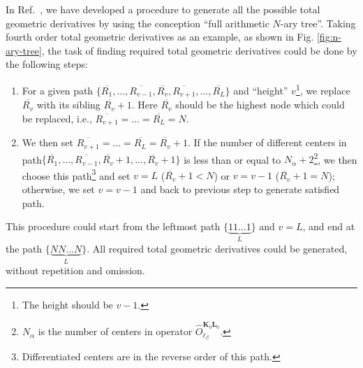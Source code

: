 \documentclass[a4paper,11pt,twoside,openright]{book}
\begin{document}
In Ref.~\cite{bgkr}, we have developed a procedure to generate all the possible total geometric
derivatives by using the conception ``full arithmetic $N$-ary tree''. Taking fourth order total geometric
derivatives as an example, as shown in Fig. \ref{fig:n-ary-tree}, the task of finding required total
geometric derivatives could be done by the following steps:
\begin{enumerate}
  \item For a given path $\{\overline{R_{1}},\dots,\overline{R_{v-1}},\overline{R_{v}},%
    \overline{R_{v+1}},\dots,\overline{R_{L}}\}$ and ``height'' $v$\footnote{The height should be $v-1$.},
    we replace $\overline{R_{v}}$ with its sibling $\overline{R_{v}}+1$. Here $\overline{R_{v}}$
    should be the highest node which could be replaced, i.e., $\overline{R_{v+1}}=\dots=\overline{R_{L}}=N$.
  \item We then set $\overline{R_{v+1}}=\dots=\overline{R_{L}}=\overline{R_{v}}+1$. If the number of
    different centers in path\linebreak $\{\overline{R_{1}},\dots,\overline{R_{v-1}},\overline{R_{v}}+1, %
    \dots,\overline{R_{v}}+1\}$ is less than or equal to $N_{\alpha}+2$\footnote{$N_{\alpha}$
    is the number of centers in operator $\hat{O}_{\ell_{\beta}}^{\boldsymbol{K}_{0}\boldsymbol{L}_{0}}$.},
    we then choose this path\footnote{Differentiated centers are in the reverse order of this path.}
    and set $v=L$ ($\overline{R_{v}}+1<N$) or $v=v-1$ ($\overline{R_{v}}+1=N$);
    otherwise, we set $v=v-1$ and back to previous step to generate satisfied path.
\end{enumerate}
This procedure could start from the leftmost path $\{\underbrace{11\dots1}_{L}\}$ and $v=L$, and
end at the path $\{\underbrace{NN\dots N}_{L}\}$. All required total geometric derivatives could be
generated, without repetition and omission.
\end{document}
